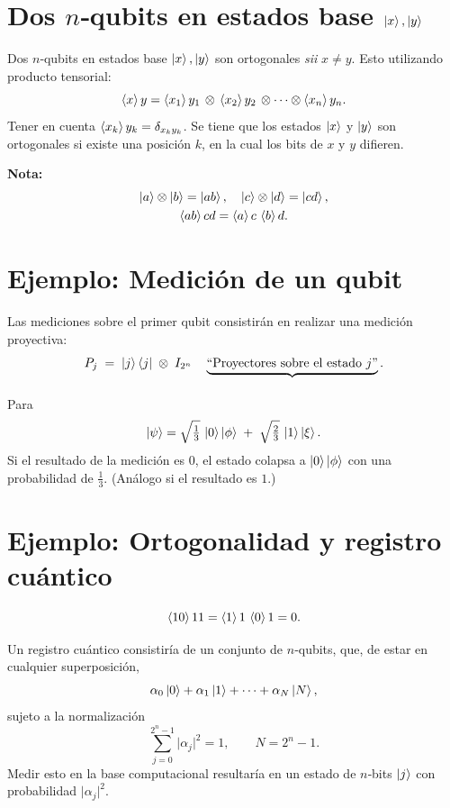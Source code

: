 \documentclass{article}
\begin{document}
\section*{Dos $n$‑qubits en estados base $\ket{x}, \ket{y}$}

Dos $n$‑qubits en estados base $\ket{x}, \ket{y}$ son ortogonales \emph{sii} $x \neq y$. Esto utilizando producto tensorial:
\[
\braket{x}{y}
= \braket{x_1}{y_1}\,\otimes\,\braket{x_2}{y_2}\,\otimes\cdots\otimes\braket{x_n}{y_n}.
\]
Tener en cuenta $\braket{x_k}{y_k} = \delta_{x_k y_k}$. Se tiene que los estados $\ket{x}$ y $\ket{y}$ son ortogonales si existe una posición $k$, en la cual los bits de $x$ y $y$ difieren.

\medskip
\textbf{Nota:}
\begin{gather*}
\ket{a}\otimes\ket{b} = \ket{ab},
\quad
\ket{c}\otimes\ket{d} = \ket{cd},\\
\braket{ab}{cd} = \braket{a}{c}\,\braket{b}{d}.
\end{gather*}

\section*{Ejemplo: Medición de un qubit}

Las mediciones sobre el primer qubit consistirán en realizar una medición proyectiva:
\[
P_j \;=\;\ket{j}\bra{j}\;\otimes\;I_{2^n}
\quad
\underbrace{\text{``Proyectores sobre el estado $j$''}}_{\text{}}.
\]
Para
\[
\ket{\psi}
= \sqrt{\tfrac{1}{3}}\,\ket{0}\ket{\phi}
\;+\;
\sqrt{\tfrac{2}{3}}\,\ket{1}\ket{\xi}.
\]
Si el resultado de la medición es $0$, el estado colapsa a $\ket{0}\ket{\phi}$ con una probabilidad de $\tfrac{1}{3}$. (Análogo si el resultado es $1$.)

\section*{Ejemplo: Ortogonalidad y registro cuántico}

\[
\braket{10}{11}
= \braket{1}{1}\,\braket{0}{1}
= 0.
\]

Un registro cuántico consistiría de un conjunto de $n$‑qubits, que, de estar en cualquier superposición,
\[
\alpha_0\ket{0} + \alpha_1\ket{1} + \dots + \alpha_N\ket{N},
\]
sujeto a la normalización
\[
\sum_{j=0}^{2^n-1} \lvert \alpha_j\rvert^2 = 1,
\qquad
N = 2^n - 1.
\]
Medir esto en la base computacional resultaría en un estado de $n$‑bits $\ket{j}$ con probabilidad $\lvert\alpha_j\rvert^2$.
\end{document}

